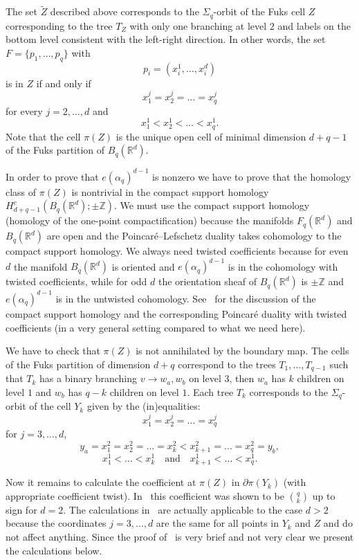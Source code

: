 \documentclass[12pt,a4paper,oneside]{amsart}
\theoremstyle{definition}
\theoremstyle{remark}
\numberwithin{equation}{section}
\newcommand{\Sg}{\Sigma}
\begin{document}
The set $\tilde Z$ described above corresponds to the $\Sg_q$-orbit of the Fuks cell $Z$ corresponding to the tree $T_Z$ with only one branching at level $2$ and labels on the bottom level consistent with the left-right direction. In other words, the set $F=\{p_1, \ldots, p_q\}$ with
$$
p_i = (x_i^1, \ldots, x_i^d)
$$ 
is in $Z$ if and only if 
$$
x_1^j = x_2^j = \dots = x_q^j
$$
for every $j=2,\ldots, d$ and 
$$
x_1^1 < x_2^1 < \dots < x_q^1.
$$
Note that the cell $\pi(Z)$ is the unique open cell of minimal dimension $d + q - 1$ of the Fuks partition of $B_q(\mathbb R^d)$.

In order to prove that $e(\alpha_q)^{d-1}$ is nonzero we have to prove that the homology class of $\pi(Z)$ is nontrivial in the compact support homology $H_{d+q-1}^c (B_q(\mathbb R^d); \pm\mathbb Z)$. We must use the compact support homology (homology of the one-point compactification) because the manifolds $F_q(\mathbb R^d)$ and $B_q(\mathbb R^d)$ are open and the Poincar\'e--Lefschetz duality takes cohomology to the compact support homology. We always need twisted coefficients because for even $d$ the manifold $B_q(\mathbb R^d)$ is oriented and $e(\alpha_q)^{d-1}$ is in the cohomology with twisted coefficients, while for odd $d$ the orientation sheaf of $B_q(\mathbb R^d)$ is $\pm \mathbb Z$ and $e(\alpha_q)^{d-1}$ is in the untwisted cohomology. See~\cite{bm1960} for the discussion of the compact support homology and the corresponding Poincar\'e duality with twisted coefficients (in a very general setting compared to what we need here).

We have to check that $\pi(Z)$ is not annihilated by the boundary map. The cells of the Fuks partition of dimension $d+q$ correspond to the trees $T_1, \ldots, T_{q-1}$ such that $T_k$ has a binary branching $v\to w_a, w_b$ on level $3$, then $w_a$ has $k$ children on level $1$ and $w_b$ has $q-k$ children on level $1$. Each tree $T_k$ corresponds to the $\Sg_q$-orbit of the cell $Y_k$ given by the (in)equalities:
$$
x_1^j = x_2^j = \dots = x_q^j
$$
for $j = 3,\ldots, d$,
$$
y_a = x_1^2 = x_2^2 = \dots = x_k^2 < x_{k+1}^2 = \dots = x_q^2 = y_b,
$$
$$
x_1^1 < \dots < x_k^1 \quad\text{and}\quad x_{k+1}^1 < \dots < x_q^1.
$$

Now it remains to calculate the coefficient at $\pi(Z)$ in $\partial \pi(Y_k)$ (with appropriate coefficient twist). In~\cite{vass1988} this coefficient was shown to be $\binom{q}{k}$ up to sign for $d=2$. The calculations in~\cite{vass1988} are actually applicable to the case $d > 2$ because the coordinates $j=3,\ldots, d$ are the same for all points in $Y_k$ and $Z$ and do not affect anything. Since the proof of~\cite[Theorem~2.5.1]{vass1988} is very brief and not very clear we present the calculations below.
\end{document}
